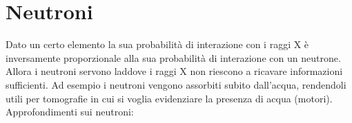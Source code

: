 \section{Neutroni}

Dato un certo elemento la sua probabilità di interazione con i raggi X è inversamente proporzionale alla sua probabilità di interazione con un neutrone. Allora i neutroni servono laddove i raggi X non riescono a ricavare informazioni sufficienti.
Ad esempio i neutroni vengono assorbiti subito dall'acqua, rendendoli utili per tomografie in cui si voglia evidenziare la presenza di acqua (motori). \\
Approfondimenti sui neutroni: \cite{Corvisiero} \cite{Assay}

